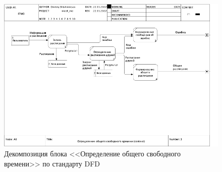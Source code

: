 \documentclass[14pt]{extreport}
\begin{document}
\begin{landscape}
    \begin{figure}[h]   
        \centering
        \includegraphics[width=0.9\linewidth]{img/DFD2.png}
        \caption{ Декомпозиция блока <<Определение общего свободного времени>> по стандарту DFD}
        \label{fig:dfd4}
    \end{figure}
\end{landscape}
\end{document}

